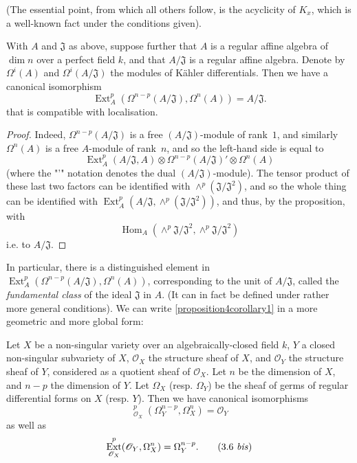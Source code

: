 \documentclass{article}
\theoremstyle{plain}
\newenvironment{corollary}[1]
  {\renewcommand\theinnercustomcorollary{#1}\innercustomcorollary}
  {\endinnercustomcorollary}
\theoremstyle{definition}
\newcommand{\sh}[1]{{\mathscr{#1}}}
\DeclareMathOperator{\Ext}{Ext}
\DeclareMathOperator{\Hom}{Hom}
\DeclareMathOperator{\shExt}{\underline{Ext}}
\newcommand{\oldpage}[1]{\marginpar{\footnotesize$\Big\vert$ \textit{p.~#1}}}
\begin{document}
(The essential point, from which all others follow, is the acyclicity of $K_x$, which is a well-known fact under the conditions given).

\begin{corollary}{1}
\label{proposition4corollary1}
  With $A$ and $\mathfrak{J}$ as above, suppose further that $A$ is a regular affine algebra of $\dim n$ over a perfect field $k$, and that $A/\mathfrak{J}$ is a regular affine algebra.
  Denote by $\Omega^i(A)$ and $\Omega^i(A/\mathfrak{J})$ the modules of K\"{a}hler differentials.
  Then we have a canonical isomorphism
  \[
  \label{3.5}
    \Ext_A^p(\Omega^{n-p}(A/\mathfrak{J}),\Omega^n(A)) = A/\mathfrak{J}.
  \tag{3.5}
  \]
  that is compatible with localisation.
\end{corollary}

\begin{proof}
  Indeed, $\Omega^{n-p}(A/\mathfrak{J})$ is a free $(A/\mathfrak{J})$-module of rank~$1$, and similarly $\Omega^n(A)$ is a free $A$-module of rank~$n$, and so the left-hand side is equal to
  \[
    \Ext_A^p(A/\mathfrak{J},A) \otimes \Omega^{n-p}(A/\mathfrak{J})' \otimes \Omega^n(A)
  \]
  (where the "'" notation denotes the dual $(A/\mathfrak{J})$-module).
  The tensor product of these last two factors can be identified with $\wedge^p(\mathfrak{J}/\mathfrak{J}^2)$, and so the whole thing can be identified with $\Ext_A^p(A/\mathfrak{J},\wedge^p(\mathfrak{J}/\mathfrak{J}^2))$, and thus, by the proposition, with
  \[
    \Hom_A(\wedge^p \mathfrak{J}/\mathfrak{J}^2,\wedge^p \mathfrak{J}/\mathfrak{J}^2)
  \]
  i.e. to $A/\mathfrak{J}$.
\end{proof}

In particular, there is a distinguished element in $\Ext_A^p(\Omega^{n-p}(A/\mathfrak{J}),\Omega^n(A))$, corresponding to the unit of $A/\mathfrak{J}$, called the \emph{fundamental class} of the ideal $\mathfrak{J}$ in $A$.
(It can in fact be defined under rather more general conditions).
We can write \cref{proposition4corollary1} in a more geometric and more global form:

\begin{corollary}{2}
\label{proposition4corollary2}
  Let $X$ be a non-singular variety over an algebraically-closed field $k$, $Y$ a closed non-singular subvariety of $X$, $\sh{O}_X$ the structure sheaf of $X$, and $\sh{O}_Y$ the structure sheaf of $Y$, considered as a quotient sheaf of $\sh{O}_X$.
  Let $n$ be the dimension of $X$, and $n-p$ the dimension of $Y$.
\oldpage{149-08}
  Let $\Omega_X$ (resp. $\Omega_Y$) be the sheaf of germs of regular differential forms on $X$ (resp. $Y$).
  Then we have canonical isomorphisms
  \[
  \label{3.6}
    \shExt_{\sh{O}_X}^p(\Omega_Y^{n-p},\Omega_X^n) = \sh{O}_Y
  \tag{3.6}
  \]
  as well as
  \[
  \label{3.6bis}
    \Ext_{\sh{O}_X}^p(\sh{O}_Y,\Omega_X^n) = \Omega_Y^{n-p}.
  \tag{3.6 \emph{bis}}
  \]
\end{corollary}
\end{document}
